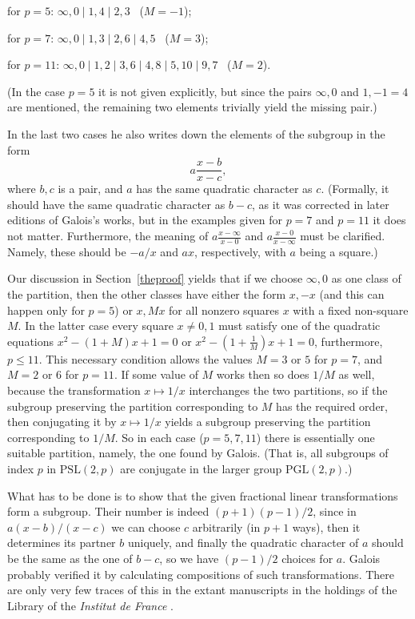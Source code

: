 \documentclass[reqno,12pt]{amsart}
\theoremstyle{definition}
\newcommand{\PSL}{\mathrm{PSL}}
\newcommand{\PGL}{\mathrm{PGL}}
\begin{document}
\hskip2cm for $p=5$: $\infty,0\mid1,4\mid2,3$ \ ($M=-1$);

\hskip2cm for $p=7$: $\infty,0\mid1,3\mid2,6\mid4,5$ \ ($M=3$);

\hskip2cm for $p=11$: $\infty,0\mid1,2\mid3,6\mid4,8\mid5,10\mid9,7$ \ ($M=2$).

(In the case $p=5$ it is not given explicitly, but since the pairs $\infty,0$ and $1,-1=4$ are mentioned,
the remaining two elements trivially yield the missing pair.)

In the last two cases he also writes down the elements of the subgroup in the form
\[
a \frac{x-b}{x-c},
\]
where $b,c$ is a pair, and $a$ has the same quadratic character as $c$. (Formally,
it should have the same quadratic character as $b-c$, as it was corrected in later
editions of Galois's works, but in the examples given for $p=7$ and $p=11$ it does
not matter. Furthermore, the meaning of $a\frac{x-\infty}{x-0}$ and $a\frac{x-0}{x-\infty}$
must be clarified. Namely, these should be $-a/x$ and $ax$, respectively, with $a$
being a square.)

Our discussion in Section~\ref{theproof} yields that if we choose $\infty, 0$ as one class of the partition, then
the other classes have either the form $x,-x$ (and this can happen only for $p=5$) or
$x,Mx$ for all nonzero squares $x$ with a fixed non-square $M$. In the latter case every square
$x\ne 0,1$ must satisfy one of the quadratic equations $x^2-(1+M)x+1=0$ or $x^2-(1+\frac{1}{M})x+1=0$,
furthermore, $p\le 11$. This necessary condition allows the values $M=3$ or $5$ for $p=7$, and
$M=2$ or $6$ for $p=11$. If some value of $M$ works then so does $1/M$ as well, because the
transformation $x\mapsto 1/x$ interchanges the two partitions, so if the subgroup
preserving the partition corresponding to $M$ has the required order, then conjugating
it by $x\mapsto 1/x$ yields a subgroup preserving the partition corresponding to $1/M$.
So in each case ($p=5,7,11$) there is essentially one suitable partition, namely, the one
found by Galois. (That is, all subgroups of index $p$ in $\PSL(2,p)$ are conjugate
in the larger group $\PGL(2,p)$.)

What has to be done is to show that the given fractional linear transformations
form a subgroup. Their number is indeed $(p+1)(p-1)/2$, since in $a(x-b)/(x-c)$ we can
choose $c$ arbitrarily (in $p+1$ ways), then it determines its partner $b$ uniquely,
and finally the quadratic character of $a$ should be the same as the one of $b-c$,
so we have $(p-1)/2$ choices for $a$. Galois probably verified it by calculating
compositions of such transformations. There are only very few traces of this in the
extant manuscripts in the holdings of the Library of the {\it Institut de France}
\cite{Galois}.
\end{document}

